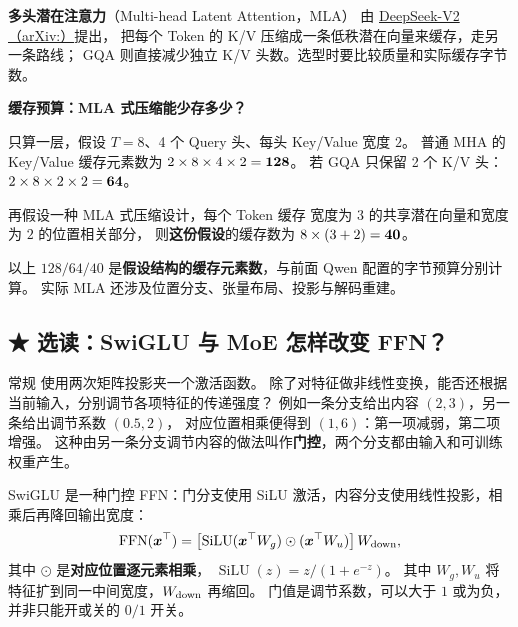 \label{concept:mla}
\textbf{多头潜在注意力}（Multi-head Latent Attention，MLA）
由 \href{https://arxiv.org/abs/2405.04434}{DeepSeek-V2（arXiv:）}提出，
把每个 Token 的 K/V 压缩成一条低秩潜在向量来缓存，走另一条路线；
GQA 则直接减少独立 K/V 头数。选型时要比较质量和实际缓存字节数。

\noindent\textbf{缓存预算：MLA 式压缩能少存多少？}\par

只算一层，假设 $T=8$、4 个 Query 头、每头 Key/Value 宽度 $2$。
普通 MHA 的 Key/Value 缓存元素数为
$2\times8\times4\times2=\boldsymbol{128}$。
若 GQA 只保留 2 个 K/V 头：
$2\times8\times2\times2=\boldsymbol{64}$。

再假设一种 MLA 式压缩设计，每个 Token 缓存
宽度为 $3$ 的共享潜在向量和宽度为 $2$ 的位置相关部分，
则\textbf{这份假设}的缓存数为
$8\times(3+2)=\boldsymbol{40}$。


\begin{boundarybox}
以上 $128/64/40$ 是\textbf{假设结构的缓存元素数}，与前面 Qwen 配置的字节预算分别计算。
实际 MLA 还涉及位置分支、张量布局、投影与解码重建。
\end{boundarybox}

\subsection{\texorpdfstring{{\symboliconfont ★}}{★} 选读：SwiGLU 与 MoE 怎样改变 FFN？}
\label{elective:architecture-extras}
\label{concept:router}
\label{concept:swiglu}
\label{concept:moe}

常规  使用两次矩阵投影夹一个激活函数。
除了对特征做非线性变换，能否还根据当前输入，分别调节各项特征的传递强度？
例如一条分支给出内容 $(2,3)$，另一条给出调节系数 $(0.5,2)$，
对应位置相乘便得到 $(1,6)$：第一项减弱，第二项增强。
这种由另一条分支调节内容的做法叫作\textbf{门控}，两个分支都由输入和可训练权重产生。

SwiGLU 是一种门控 FFN：门分支使用 SiLU 激活，内容分支使用线性投影，相乘后再降回输出宽度：
\begin{equation}
\operatorname{FFN}(\boldsymbol{x}^\top)
=\left[
\operatorname{SiLU}(\boldsymbol{x}^\top W_g)
\odot(\boldsymbol{x}^\top W_u)\right]W_{\rm down},
\label{eq:swiglu-illustration}
\end{equation}
其中 $\odot$ 是\textbf{对应位置逐元素相乘}，
$\operatorname{SiLU}(z)=z/(1+e^{-z})$。
其中 $W_g,W_u$ 将特征扩到同一中间宽度，$W_{\rm down}$ 再缩回。
门值是调节系数，可以大于 $1$ 或为负，并非只能开或关的 $0/1$ 开关。


